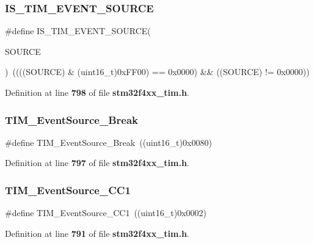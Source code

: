 \subsubsection{I\+S\+\_\+\+T\+I\+M\+\_\+\+E\+V\+E\+N\+T\+\_\+\+S\+O\+U\+R\+CE}
{\footnotesize\ttfamily \#define I\+S\+\_\+\+T\+I\+M\+\_\+\+E\+V\+E\+N\+T\+\_\+\+S\+O\+U\+R\+CE(\begin{DoxyParamCaption}\item[{}]{S\+O\+U\+R\+CE }\end{DoxyParamCaption})~((((S\+O\+U\+R\+CE) \& (uint16\+\_\+t)0x\+F\+F00) == 0x0000) \&\& ((\+S\+O\+U\+R\+C\+E) != 0x0000))}



Definition at line \textbf{ 798} of file \textbf{ stm32f4xx\+\_\+tim.\+h}.

\mbox{\label{group__TIM__Event__Source_gad6f9b5366d93c73ff005273c50c9f00a}} 
\subsubsection{T\+I\+M\+\_\+\+Event\+Source\+\_\+\+Break}
{\footnotesize\ttfamily \#define T\+I\+M\+\_\+\+Event\+Source\+\_\+\+Break~((uint16\+\_\+t)0x0080)}



Definition at line \textbf{ 797} of file \textbf{ stm32f4xx\+\_\+tim.\+h}.

\mbox{\label{group__TIM__Event__Source_gaa634c46d4ac521ad16e25be97b487e8a}} 
\subsubsection{T\+I\+M\+\_\+\+Event\+Source\+\_\+\+C\+C1}
{\footnotesize\ttfamily \#define T\+I\+M\+\_\+\+Event\+Source\+\_\+\+C\+C1~((uint16\+\_\+t)0x0002)}



Definition at line \textbf{ 791} of file \textbf{ stm32f4xx\+\_\+tim.\+h}.

